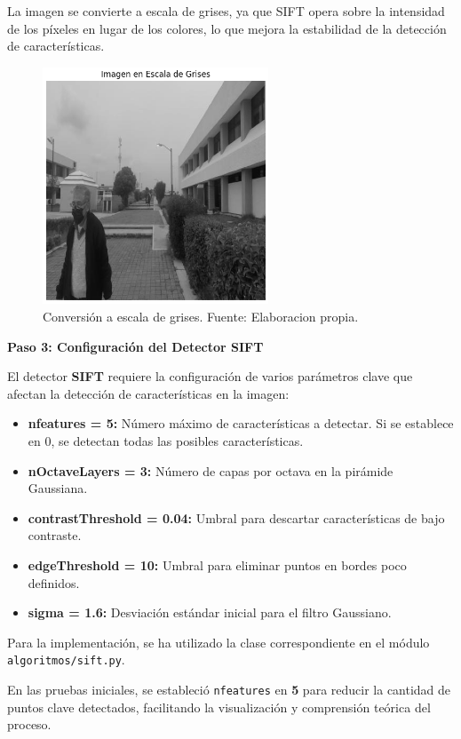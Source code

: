 \documentclass[a4paper]{article}
\begin{document}
La imagen se convierte a escala de grises, ya que SIFT opera sobre la intensidad de los píxeles en lugar de los colores, lo que mejora la estabilidad de la detección de características.

\begin{figure}[H]
    \centering
    \includegraphics[width=0.6\textwidth]{images/sift_paso_2.png}
    \caption{Conversión a escala de grises. Fuente: Elaboracion propia.}
\end{figure}

\textbf{Paso 3: Configuración del Detector SIFT}
\par\vspace{0.5cm}

El detector \textbf{SIFT} requiere la configuración de varios parámetros clave que afectan la detección de características en la imagen:

\begin{itemize}
    \item \textbf{nfeatures = 5:} Número máximo de características a detectar. Si se establece en 0, se detectan todas las posibles características.
    \item \textbf{nOctaveLayers = 3:} Número de capas por octava en la pirámide Gaussiana.
    \item \textbf{contrastThreshold = 0.04:} Umbral para descartar características de bajo contraste.
    \item \textbf{edgeThreshold = 10:} Umbral para eliminar puntos en bordes poco definidos.
    \item \textbf{sigma = 1.6:} Desviación estándar inicial para el filtro Gaussiano.
\end{itemize}

Para la implementación, se ha utilizado la clase correspondiente en el módulo \texttt{algoritmos/sift.py}. 
\par\vspace{0.5cm}
En las pruebas iniciales, se estableció \texttt{nfeatures} en \textbf{5} para reducir la cantidad de puntos clave detectados, 
facilitando la visualización y comprensión teórica del proceso.
\par\vspace{0.5cm}
\end{document}
